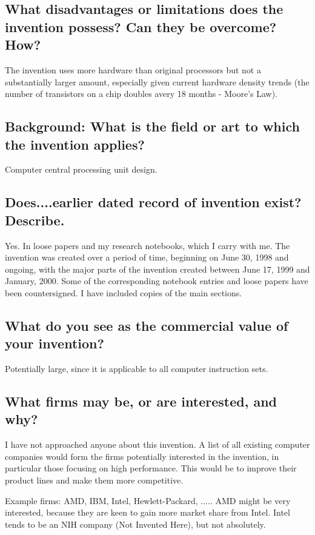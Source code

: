\documentclass[10pt,dvips]{article}
\begin{document}
\subsection{What disadvantages or limitations does the invention possess?
Can they be overcome? How?}
The invention uses more hardware than original processors
but not a substantially larger amount, especially
given current hardware density trends (the number of transistors on a chip doubles
avery 18 months - Moore's Law). 

\subsection{Background: What is the field or art to which the invention applies?}
Computer central processing unit design.

\subsection{Does....earlier dated record of invention exist? Describe.}
Yes. In loose papers and my research notebooks, which I carry with me.
The invention was created
over a period of time, beginning on June 30, 1998 and ongoing, with the major
parts of
the invention created between June 17, 1999 and January, 2000. Some of
the corresponding
notebook entries and loose papers have been countersigned. I have included
copies of the main sections.

\subsection{What do you see as the commercial value of your invention?}
Potentially large, since it is applicable to all computer instruction sets.

\subsection{What firms may be, or are interested, and why?}
I have not approached anyone about this invention. A list of all
existing computer
companies would form the firms potentially interested in the invention,
in particular those
focusing on high performance. This would be to improve their product lines
and make them more competitive.

Example firms: AMD, IBM, Intel, Hewlett-Packard, ..... AMD
might be very interested,
because they are keen to gain more market share from Intel. Intel tends to be
an NIH company (Not Invented Here), but not absolutely.
\end{document}

